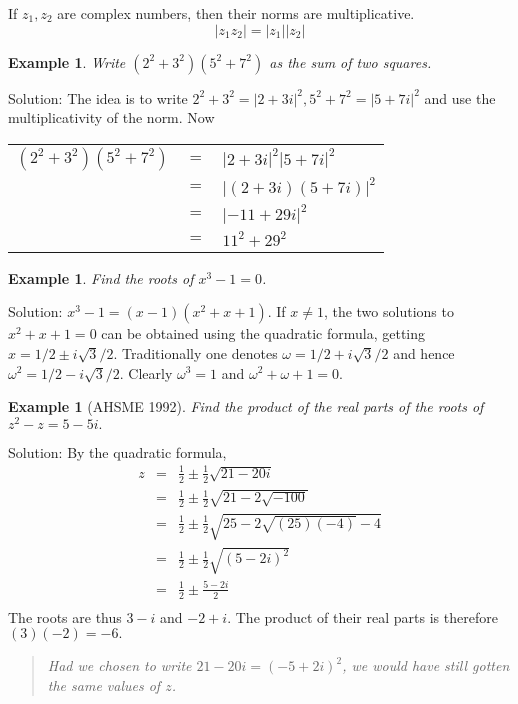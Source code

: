\documentclass[11pt, openany]{book}
\theoremstyle{change} \theoremheaderfont{\blue\sffamily\bfseries}
\newtheorem{exa}[thm]{Example}
\theoremstyle{nonumberplain} \theoremheaderfont{\sffamily\bfseries}
\newenvironment{rem}[0]{\begin{quote}{\huge\textcolor{red}{\Pisymbol{pzd}{43}}}\itshape }{\end{quote}}
\newcommand{\dis}{\displaystyle}
\newcommand{\í}{\'{\i}}
\begin{document}
If $z_1, z_2$ are complex numbers, then their norms are
multiplicative.
\begin{equation} |z_1z_2| = |z_1||z_2|\end{equation}

\begin{exa}
Write $(2^2 + 3^2)(5^2 + 7^2)$ as the sum of two squares.
\end{exa}
Solution: The idea is to write $2^2 + 3^2 = |2 + 3i|^2, 5^2 + 7^2
= |5 + 7i|^2$ and use the multiplicativity of the norm.
Now \\
\begin{center}
\begin{tabular}{lll}
$(2^2 + 3^2)(5^2 + 7^2)$ &  $=$ &  $|2 + 3i|^2|5 + 7i|^2$ \\
&  $=$ & $|(2 + 3i)(5 + 7i)|^2$ \\
&  $=$ & $|-11 + 29i|^2$ \\
& $=$ & $11^2 + 29^2$
\end{tabular}
 \end{center}
\begin{exa}
Find the roots of $x^3 - 1 = 0$.

\end{exa}
Solution: $x^3 - 1 = (x - 1)(x^2 + x + 1)$. If $x \neq 1$, the two
solutions to $x^2 + x + 1 = 0$ can be obtained using the quadratic
formula, getting $\dis{x = 1/2 \pm i\sqrt{3}/2}$. Traditionally
one denotes $\omega = 1/2 + i\sqrt{3}/2$ and hence $\omega ^2 =
1/2 - i\sqrt{3}/2$. Clearly $\omega ^3 = 1$ and $\omega ^2 +
\omega + 1 = 0.$

\begin{exa}[AHSME 1992]
Find the product of the real parts of the roots of $z^2 - z = 5 -
5i.$
\end{exa}
Solution: By the quadratic formula,
\renewcommand{\arraystretch}{1.8}
$$
\begin{array}{lll}
z & = & \frac{1}{2} \pm \frac{1}{2}\sqrt{21 - 20i} \\
& = & \frac{1}{2} \pm \frac{1}{2}\sqrt{21 - 2\sqrt{-100}} \\
& = & \frac{1}{2} \pm \frac{1}{2}\sqrt{25 - 2\sqrt{(25)(-4)} - 4} \\
& = & \frac{1}{2} \pm \frac{1}{2}\sqrt{(5 - 2i)^2} \\
& = & \frac{1}{2} \pm \frac{5 - 2i}{2} \\

\end{array}
$$
The roots are thus $3 - i$ and $-2 + i$. The product of their real
parts is therefore
$(3)(-2) = -6.$\\
\begin{rem} Had we chosen  to write $21 - 20i = (-5 + 2i)^2$, we
would have still gotten the same values of $z$.
\end{rem}
\clearpage
\end{document}
